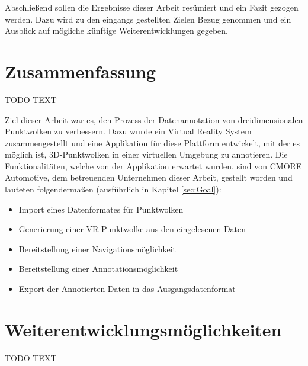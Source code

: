 Abschließend sollen die Ergebnisse dieser Arbeit resümiert und ein Fazit gezogen werden. Dazu wird zu den eingangs gestellten Zielen Bezug genommen und ein Ausblick auf mögliche künftige Weiterentwicklungen gegeben.


\section{Zusammenfassung}
TODO TEXT

Ziel dieser Arbeit war es, den Prozess der Datenannotation von dreidimensionalen Punktwolken zu verbessern. Dazu wurde ein Virtual Reality System zusammengestellt und eine Applikation für diese Plattform entwickelt, mit der es möglich ist, 3D-Punktwolken in einer virtuellen Umgebung zu annotieren. Die Funktionalitäten, welche von der Applikation erwartet wurden, sind von CMORE Automotive, dem betreuenden Unternehmen dieser Arbeit, gestellt worden und lauteten folgendermaßen (ausführlich in Kapitel \ref{sec:Goal}): \\

\begin{itemize}
\item Import eines Datenformates für Punktwolken\\
\item Generierung einer VR-Punktwolke aus den eingelesenen Daten\\
\item Bereitstellung einer Navigationsmöglichkeit\\
\item Bereitstellung einer Annotationsmöglichkeit\\
\item Export der Annotierten Daten in das Ausgangsdatenformat \\
\end{itemize}

%


\section{Weiterentwicklungsmöglichkeiten}
TODO TEXT